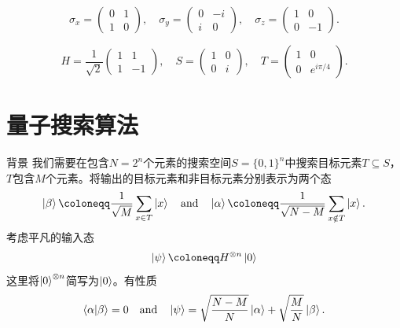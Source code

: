 \documentclass{beamer}
\begin{document}
\begin{frame}{}
    \begin{equation}
        \sigma_x = \begin{pmatrix} 0 & 1 \\ 1 & 0 \end{pmatrix}, \quad
        \sigma_y = \begin{pmatrix} 0 & -i \\ i & 0 \end{pmatrix}, \quad
        \sigma_z = \begin{pmatrix} 1 & 0 \\ 0 & -1 \end{pmatrix}.
    \end{equation}

    \begin{equation}
        H = \frac{1}{\sqrt{2}}\begin{pmatrix} 1 & 1 \\ 1 & -1 \end{pmatrix}, \quad
        S = \begin{pmatrix} 1 & 0 \\ 0 & i \end{pmatrix}, \quad
        T = \begin{pmatrix} 1 & 0 \\ 0 & e^{i\pi/4} \end{pmatrix}.
    \end{equation}
\end{frame}



\section{量子搜索算法}

\begin{frame}{背景}
    我们需要在包含$N=2^{n}$个元素的搜索空间$S=\{0,1\}^{n}$中搜索目标元素$T\subseteq S$，$T$包含$M$个元素。将输出的目标元素和非目标元素分别表示为两个态
    \begin{equation}
        \ket{\beta}\coloneqq\frac{1}{\sqrt{M}}\sum_{x\in T}\ket{x}
        \quad\text{and}\quad
        \ket{\alpha}\coloneqq\frac{1}{\sqrt{N-M}}\sum_{x\notin T}\ket{x}.
    \end{equation}
    考虑平凡的输入态
    \begin{equation}
        \ket{\psi}\coloneqq H^{\otimes n}\ket{0}
    \end{equation}
    这里将$\ket{0}^{\otimes n}$简写为$\ket{0}$。有性质
    \begin{equation}
        \braket{\alpha|\beta}=0
        \quad\text{and}\quad
        \ket{\psi}=\sqrt{\frac{N-M}{N}}\ket{\alpha}+\sqrt{\frac{M}{N}}\ket{\beta}.
    \end{equation}
\end{frame}
\end{document}
